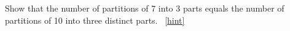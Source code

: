 \documentclass{book}
\begin{document}
\setcounter{project}{311}
\addtocounter{project}{-1}
\begin{activity}[]\label{activity-304}
\hypertarget{p-1594}{}%
Show that the number of partitions of 7 into 3 parts equals the number of partitions of 10 into three distinct parts.%
~\hfill{\tiny\hyperlink{a-311}{[hint]}\hypertarget{q-311}{}}\end{activity}
\end{document}
